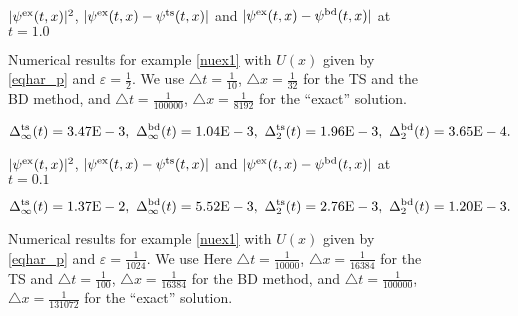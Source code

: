 \documentclass[leqno,final]{siamltex}
\numberwithin{equation}{section}
\newcounter{me}
\begin{document}
\begin{figure} \footnotesize
\begin{center}

$|\psi^{\rm ex}(t,x)|^2$, $|\psi^{\rm ex}(t,x)-\psi^{\rm
ts}(t,x)|$ and $|\psi^{\rm ex}(t,x)-\psi^{\rm bd}(t,x)|$ at
$t=1.0$\vspace{-1mm}
\caption{Numerical results for example
\ref{nuex1} with $U(x)$ given by \eqref{eqhar_p} and
${{\varepsilon }}={\frac{{1}}{{2}}}$. We use ${\triangle} t={\frac{{1}}{{10}}}$, ${\triangle} x={\frac{{1}}{{32}}}$ for the
TS and the BD method, and ${\triangle} t={\frac{{1}}{{100000}}}$, ${\triangle}
x={\frac{{1}}{{8192}}}$ for the ``exact'' solution.
}\label{fig14}\vspace{-3mm}
\[\Delta^{\rm ts}_\infty(t)=3.47{\rm{E}}-3,\
\Delta^{\rm bd}_\infty(t)=1.04{\rm{E}}-3,\
\Delta^{\rm ts}_2(t)=1.96{\rm{E}}-3,\
\Delta^{\rm bd}_2(t)= 3.65{\rm{E}}-4.\]


$|\psi^{\rm ex}(t,x)|^2$, $|\psi^{\rm ex}(t,x)-\psi^{\rm ts}(t,x)|$
and $|\psi^{\rm ex}(t,x)-\psi^{\rm bd}(t,x)|$ at $t=0.1$
\end{center}\vspace{-1mm}
\caption{Numerical results for example \ref{nuex1} with $U(x)$
given by \eqref{eqhar_p} and ${{\varepsilon }}={\frac{{1}}{{1024}}}$. We use Here ${\triangle}
t={\frac{{1}}{{10000}}}$, ${\triangle} x={\frac{{1}}{{16384}}}$ for the TS and ${\triangle}
t={\frac{{1}}{{100}}}$, ${\triangle} x={\frac{{1}}{{16384}}}$ for the BD method, and ${\triangle}
t={\frac{{1}}{{100000}}}$, ${\triangle} x={\frac{{1}}{{131072}}}$ for the ``exact''
solution. }\label{fig15}\vspace{-3mm}
\[\Delta^{\rm ts}_\infty(t)=1.37{\rm{E}}-2,\
\Delta^{\rm bd}_\infty(t)=5.52{\rm{E}}-3,\
\Delta^{\rm ts}_2(t)=2.76{\rm{E}}-3,\
\Delta^{\rm bd}_2(t)=1.20{\rm{E}}-3.\]
\end{figure}
\end{document}
